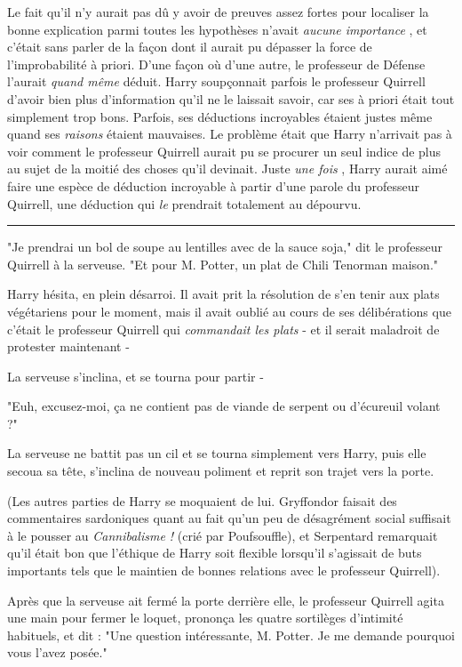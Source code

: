 Le fait qu'il n'y aurait pas dû y avoir de preuves assez fortes pour localiser la bonne explication parmi toutes les hypothèses n'avait \emph{aucune importance} , et c'était sans parler de la façon dont il aurait pu dépasser la force de l'improbabilité à priori. D'une façon où d'une autre, le professeur de Défense l'aurait \emph{quand même}  déduit. Harry soupçonnait parfois le professeur Quirrell d'avoir bien plus d'information qu'il ne le laissait savoir, car ses à priori était tout simplement trop bons. Parfois, ses déductions incroyables étaient justes même quand ses \emph{raisons}  étaient mauvaises. Le problème était que Harry n'arrivait pas à voir comment le professeur Quirrell aurait pu se procurer un seul indice de plus au sujet de la moitié des choses qu'il devinait. Juste \emph{une fois} , Harry aurait aimé faire une espèce de déduction incroyable à partir d'une parole du professeur Quirrell, une déduction qui \emph{le}  prendrait totalement au dépourvu.
\par\noindent\rule{\textwidth}{0.4pt}
"Je prendrai un bol de soupe au lentilles avec de la sauce soja," dit le professeur Quirrell à la serveuse. "Et pour M. Potter, un plat de Chili Tenorman maison."

Harry hésita, en plein désarroi. Il avait prit la résolution de s'en tenir aux plats végétariens pour le moment, mais il avait oublié au cours de ses délibérations que c'était le professeur Quirrell qui \emph{commandait les plats } - et il serait maladroit de protester maintenant -

La serveuse s'inclina, et se tourna pour partir -

"Euh, excusez-moi, ça ne contient pas de viande de serpent ou d'écureuil volant ?"

La serveuse ne battit pas un cil et se tourna simplement vers Harry, puis elle secoua sa tête, s'inclina de nouveau poliment et reprit son trajet vers la porte.

(Les autres parties de Harry se moquaient de lui. Gryffondor faisait des commentaires sardoniques quant au fait qu'un peu de désagrément social suffisait à le pousser au \emph{Cannibalisme ! } (crié par Poufsouffle), et Serpentard remarquait qu'il était bon que l'éthique de Harry soit flexible lorsqu'il s'agissait de buts importants tels que le maintien de bonnes relations avec le professeur Quirrell).

Après que la serveuse ait fermé la porte derrière elle, le professeur Quirrell agita une main pour fermer le loquet, prononça les quatre sortilèges d'intimité habituels, et dit : "Une question intéressante, M. Potter. Je me demande pourquoi vous l'avez posée."

